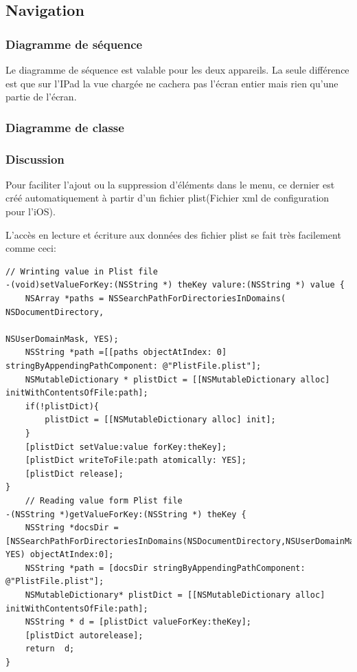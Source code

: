 	
	\subsection{Navigation}
		\subsubsection*{Diagramme de séquence}
			Le diagramme de séquence est valable pour les deux appareils. La seule différence est que sur l'IPad la vue chargée ne cachera pas l'écran entier mais rien qu'une partie de l'écran.
		\subsubsection*{Diagramme de classe}
		\subsubsection*{Discussion}
		Pour faciliter l'ajout ou la suppression d'éléments dans le menu, ce dernier est créé automatiquement à partir  d'un fichier plist(Fichier xml de configuration pour l'iOS). 
			
		L'accès en lecture et écriture aux données des fichier plist se fait très facilement comme ceci:
	\lstset{
	    style = Xcode,
	    caption=Code d'ecriture et de lecture dans un fichier plist.,
	    breaklines=true,
	    frame=single
	}
	
	\begin{lstlisting}[name=R/W in plist, label=SampleCode]
	// Wrinting value in Plist file
-(void)setValueForKey:(NSString *) theKey valure:(NSString *) value {
    NSArray *paths = NSSearchPathForDirectoriesInDomains( NSDocumentDirectory,
                                                         NSUserDomainMask, YES); 
    NSString *path =[[paths objectAtIndex: 0] stringByAppendingPathComponent: @"PlistFile.plist"];
    NSMutableDictionary * plistDict = [[NSMutableDictionary alloc] initWithContentsOfFile:path];
    if(!plistDict){
        plistDict = [[NSMutableDictionary alloc] init];
    }
    [plistDict setValue:value forKey:theKey];
    [plistDict writeToFile:path atomically: YES];
    [plistDict release];
}
	// Reading value form Plist file
-(NSString *)getValueForKey:(NSString *) theKey {
    NSString *docsDir = [NSSearchPathForDirectoriesInDomains(NSDocumentDirectory,NSUserDomainMask, YES) objectAtIndex:0];
    NSString *path = [docsDir stringByAppendingPathComponent: @"PlistFile.plist"];
    NSMutableDictionary* plistDict = [[NSMutableDictionary alloc] initWithContentsOfFile:path];
    NSString * d = [plistDict valueForKey:theKey];
    [plistDict autorelease];
    return  d;
}
\end{lstlisting}


